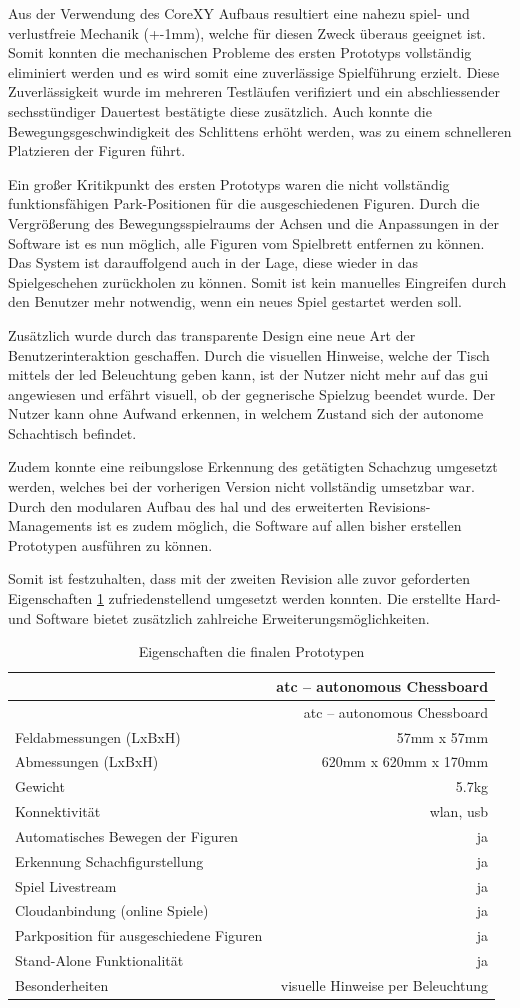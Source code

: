 Aus der Verwendung des CoreXY Aufbaus resultiert eine nahezu spiel- und
verlustfreie Mechanik (+-1mm), welche für diesen Zweck überaus geeignet
ist. Somit konnten die mechanischen Probleme des ersten Prototyps
vollständig eliminiert werden und es wird somit eine zuverlässige
Spielführung erzielt. Diese Zuverlässigkeit wurde im mehreren Testläufen
verifiziert und ein abschliessender sechsstündiger Dauertest bestätigte
diese zusätzlich. Auch konnte die Bewegungsgeschwindigkeit des
Schlittens erhöht werden, was zu einem schnelleren Platzieren der
Figuren führt.

Ein großer Kritikpunkt des ersten Prototyps waren die nicht vollständig
funktionsfähigen Park-Positionen für die ausgeschiedenen Figuren. Durch
die Vergrößerung des Bewegungsspielraums der Achsen und die Anpassungen
in der Software ist es nun möglich, alle Figuren vom Spielbrett
entfernen zu können. Das System ist darauffolgend auch in der Lage,
diese wieder in das Spielgeschehen zurückholen zu können. Somit ist kein
manuelles Eingreifen durch den Benutzer mehr notwendig, wenn ein neues
Spiel gestartet werden soll.

Zusätzlich wurde durch das transparente Design eine neue Art der
Benutzerinteraktion geschaffen. Durch die visuellen Hinweise, welche der
Tisch mittels der \gls{led} Beleuchtung geben kann, ist der Nutzer nicht
mehr auf das \gls{gui} angewiesen und erfährt visuell, ob der
gegnerische Spielzug beendet wurde. Der Nutzer kann ohne Aufwand
erkennen, in welchem Zustand sich der autonome Schachtisch befindet.

Zudem konnte eine reibungslose Erkennung des getätigten Schachzug
umgesetzt werden, welches bei der vorherigen Version nicht vollständig
umsetzbar war. Durch den modularen Aufbau des \gls{hal} und des
erweiterten Revisions-Managements ist es zudem möglich, die Software auf
allen bisher erstellen Prototypen ausführen zu können.

Somit ist festzuhalten, dass mit der zweiten Revision alle zuvor
geforderten Eigenschaften \ref{finalfeaturesatc} zufriedenstellend
umgesetzt werden konnten. Die erstellte Hard- und Software bietet
zusätzlich zahlreiche Erweiterungsmöglichkeiten.

\begin{longtable}[]{@{}lr@{}}
\caption{Eigenschaften die finalen Prototypen
\label{finalfeaturesatc}}\tabularnewline
\toprule
& \gls{atc} -- autonomous Chessboard\tabularnewline
\midrule
\endfirsthead
\toprule
& \gls{atc} -- autonomous Chessboard\tabularnewline
\midrule
\endhead
Feldabmessungen (LxBxH) & 57mm x 57mm\tabularnewline
Abmessungen (LxBxH) & 620mm x 620mm x 170mm\tabularnewline
Gewicht & 5.7kg\tabularnewline
Konnektivität & \gls{wlan}, \gls{usb}\tabularnewline
Automatisches Bewegen der Figuren & ja\tabularnewline
Erkennung Schachfigurstellung & ja\tabularnewline
Spiel Livestream & ja\tabularnewline
Cloudanbindung (online Spiele) & ja\tabularnewline
Parkposition für ausgeschiedene Figuren & ja\tabularnewline
Stand-Alone Funktionalität & ja\tabularnewline
Besonderheiten & visuelle Hinweise per Beleuchtung\tabularnewline
\bottomrule
\end{longtable}

